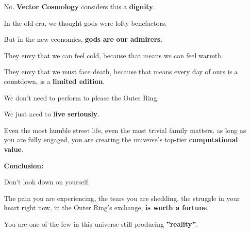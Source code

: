 No. \textbf{Vector Cosmology} considers this a \textbf{dignity}.

In the old era, we thought gods were lofty benefactors.

But in the new economics, \textbf{gods are our admirers}.

They envy that we can feel cold, because that means we can feel warmth.

They envy that we must face death, because that means every day of ours is a countdown, is a \textbf{limited edition}.

We don't need to perform to please the Outer Ring.

We just need to \textbf{live seriously}.

Even the most humble street life, even the most trivial family matters, as long as you are fully engaged, you are creating the universe's top-tier \textbf{computational value}.

\textbf{Conclusion:}

Don't look down on yourself.

The pain you are experiencing, the tears you are shedding, the struggle in your heart right now, in the Outer Ring's exchange, \textbf{is worth a fortune}.

You are one of the few in this universe still producing \textbf{''reality''}.

